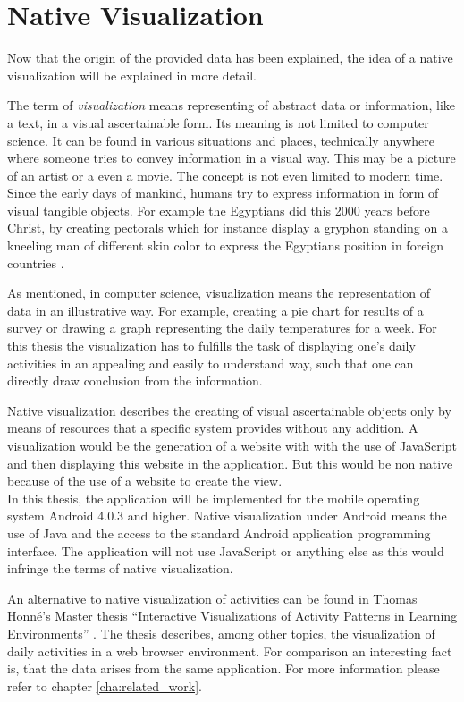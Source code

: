 \section{Native Visualization}
Now that the origin of the provided data has been explained, the idea of a native visualization will be explained in more detail.

The  term of \emph{visualization} means representing of abstract data or information, like a text, in a visual ascertainable form. Its meaning is not limited to computer science. It can be found in various situations and places, technically anywhere where someone tries to convey information in a visual way. This may be a picture of an artist or a even a movie. The concept is not even limited to modern time. Since the early days of mankind, humans try to express information in form of visual tangible objects. For example the Egyptians did this 2000 years before Christ, by creating pectorals which for instance display a gryphon standing on a kneeling man of different skin color to express the Egyptians position in foreign countries \cite{sarahhallersthesis}.

As mentioned, in computer science, visualization means the representation of data in an illustrative way. For example, creating a pie chart for results of a survey or drawing a graph representing the daily temperatures for a week. For this thesis the visualization has to fulfills the task of displaying one's daily activities in an appealing and easily to understand way, such that one can directly draw conclusion from the information.

Native  visualization describes the creating of visual ascertainable objects only by means of resources that a specific system provides without any addition. A visualization would be the generation of a website with with the use of JavaScript and then displaying this website in the application. But this would be non native because of the use of a website to create the view.\\
In this thesis, the application will be implemented for the mobile operating system Android 4.0.3 and higher. Native visualization under Android means the use of Java and the access to the standard Android application programming interface. The application will not use JavaScript or anything else as this would infringe the terms of native visualization.

An  alternative to native visualization of activities can be found in Thomas Honné's Master thesis ``Interactive Visualizations of Activity Patterns in Learning Environments'' \cite{thomasthesis}. The thesis describes, among other topics, the visualization of daily activities in a web browser environment. For comparison an interesting fact is, that the data arises from the same application. For more information please refer to chapter \ref{cha:related_work}.

